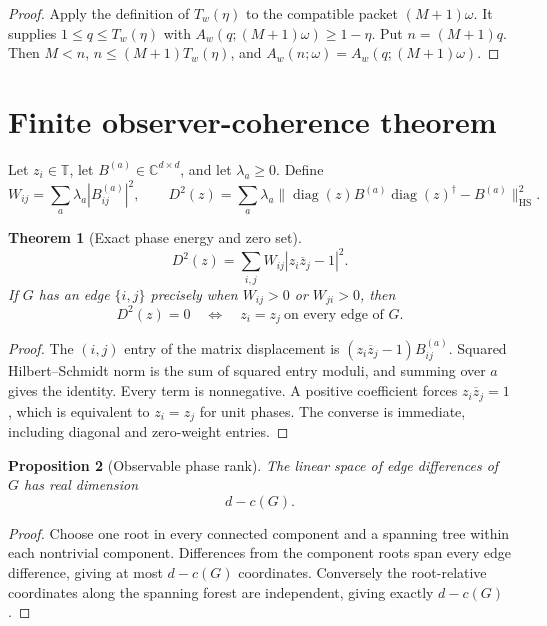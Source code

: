 \documentclass[10pt]{article}
\newtheorem{theorem}{Theorem}[section]
\newtheorem{proposition}[theorem]{Proposition}
\theoremstyle{definition}
\newcommand{\C}{\mathbb C}
\newcommand{\T}{\mathbb T}
\newcommand{\HS}{\mathrm{HS}}
\begin{document}
\begin{proof}
Apply the definition of \(T_w(\eta)\) to the compatible packet
\((M+1)\omega\).  It supplies \(1\leq q\leq T_w(\eta)\) with
\(A_w(q;(M+1)\omega)\geq1-\eta\).  Put \(n=(M+1)q\).  Then \(M<n\),
\(n\leq(M+1)T_w(\eta)\), and
\(A_w(n;\omega)=A_w(q;(M+1)\omega)\).
\end{proof}

\section{Finite observer-coherence theorem}

Let \(z_i\in\T\), let \(B^{(a)}\in\C^{d\times d}\), and let
\(\lambda_a\geq0\).  Define
\[
 W_{ij}=\sum_a\lambda_a|B^{(a)}_{ij}|^2,\qquad
 D^2(z)=\sum_a\lambda_a
 \|\operatorname{diag}(z)B^{(a)}
   \operatorname{diag}(z)^\dagger-B^{(a)}\|_{\HS}^2.
\]

\begin{theorem}[Exact phase energy and zero set]
\label{thm:observer}
\[
 D^2(z)=\sum_{i,j}W_{ij}|z_i\overline z_j-1|^2.
\]
If \(G\) has an edge \(\{i,j\}\) precisely when
\(W_{ij}>0\) or \(W_{ji}>0\), then
\[
 D^2(z)=0
 \quad\Longleftrightarrow\quad
 z_i=z_j\ \text{on every edge of }G.
\]
\end{theorem}

\begin{proof}
The \((i,j)\) entry of the matrix displacement is
\((z_i\overline z_j-1)B^{(a)}_{ij}\).  Squared Hilbert--Schmidt norm is the
sum of squared entry moduli, and summing over \(a\) gives the identity.
Every term is nonnegative.  A positive coefficient forces
\(z_i\overline z_j=1\), which is equivalent to \(z_i=z_j\) for unit phases.
The converse is immediate, including diagonal and zero-weight entries.
\end{proof}

\begin{proposition}[Observable phase rank]
\label{prop:rank}
The linear space of edge differences of \(G\) has real dimension
\[
 d-c(G).
\]
\end{proposition}

\begin{proof}
Choose one root in every connected component and a spanning tree within each
nontrivial component.  Differences from the component roots span every edge
difference, giving at most \(d-c(G)\) coordinates.  Conversely the
root-relative coordinates along the spanning forest are independent, giving
exactly \(d-c(G)\).
\end{proof}
\end{document}
